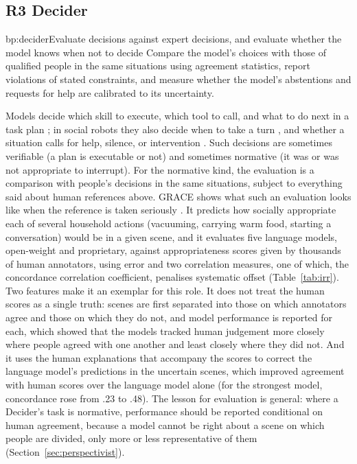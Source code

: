 \subsection{R3 Decider}

\begin{practice}{bp:decider}{Evaluate decisions against expert decisions, and evaluate whether the model knows when not to decide}
Compare the model's choices with those of qualified people in the same
situations using agreement statistics, report violations of stated
constraints, and measure whether the model's abstentions and requests for
help are calibrated to its uncertainty.
\end{practice}

Models decide which skill to execute, which tool to call, and what to do
next in a task plan \cite{ahn2022do,liang2023code}; in social robots they
also decide when to take a turn \cite{skantze2025applying}, and whether a
situation calls for help, silence, or intervention
\cite{tanneberg2024help}. Such decisions are sometimes verifiable (a plan is
executable or not) and sometimes normative (it was or was not appropriate to
interrupt). For the normative kind, the evaluation is a comparison with
people's decisions in the same situations, subject to everything said about
human references above. GRACE shows what such an evaluation looks like when
the reference is taken seriously \cite{dogan2025grace}. It predicts how
socially appropriate each of several household actions (vacuuming, carrying
warm food, starting a conversation) would be in a given scene, and it
evaluates five language models, open-weight and proprietary, against
appropriateness scores given by thousands of human annotators, using error
and two correlation measures, one of which, the concordance correlation
coefficient, penalises systematic offset (Table~\ref{tab:irr}). Two features
make it an exemplar for this role. It does not treat the human scores as a
single truth: scenes are first separated into those on which annotators
agree and those on which they do not, and model performance is reported for
each, which showed that the models tracked human judgement more closely
where people agreed with one another and least closely where they did not.
And it uses the human explanations that accompany the scores to correct the
language model's predictions in the uncertain scenes, which improved
agreement with human scores over the language model alone (for the
strongest model, concordance rose from .23 to .48). The lesson for
evaluation is general: where a Decider's task is normative, performance
should be reported conditional on human agreement, because a model cannot be
right about a scene on which people are divided, only more or less
representative of them (Section~\ref{sec:perspectivist}).

